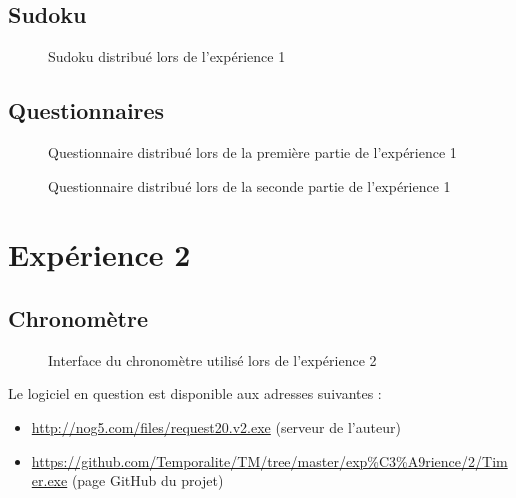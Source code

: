 \documentclass[12pt,fleqn,oneside,openany]{book} %
\begin{document}
\subsection*{Sudoku} \label{sec:Sudoku}
\begin{figure}[htp]  %
	\caption{Sudoku distribué lors de l'expérience 1}
\end{figure}  

\newpage
\subsection*{Questionnaires} \label{sec:Questionnaires}
\begin{figure}[htp] 
	\caption{Questionnaire distribué lors de la première partie de l'expérience 1}
\end{figure}

\newpage
\begin{figure}[htp] 
	\caption{Questionnaire distribué lors de la seconde partie de l'expérience 1}
\end{figure}

\newpage
\section*{Expérience 2}

\subsection*{Chronomètre} \label{sec:chrono}
\begin{figure}[htp] 
	\caption{Interface du chronomètre utilisé lors de l'expérience 2}
\end{figure}
Le logiciel en question est disponible aux adresses suivantes :
\begin{itemize}
\item \url{http://nog5.com/files/request20.v2.exe} (serveur de l'auteur)
\item \url{https://github.com/Temporalite/TM/tree/master/exp%C3%A9rience/2/Timer.exe} (page GitHub du projet)
\end{itemize}
\end{document}
